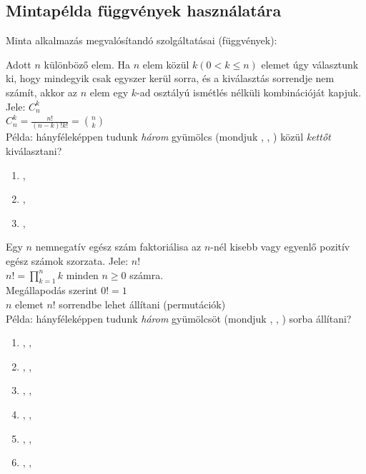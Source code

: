 \documentclass[usenames,dvipsnames,aspectratio=169]{beamer}
\begin{document}
\subsection{Mintapélda függvények használatára}
\begin{frame}
  Minta alkalmazás megvalósítandó szolgáltatásai (függvények):
  \vfill
  \begin{description}[mm]
    \item[Kombináció] Adott $n$ különböző elem. Ha $n$ elem közül $k (0 < k \leq n)$ elemet úgy választunk ki, 
hogy mindegyik csak egyszer kerül sorra, és a kiválasztás sorrendje nem számít, akkor az $n$ elem egy $k$-ad osztályú ismétlés 
nélküli kombinációját kapjuk. Jele: $C_n^k$\\
    \vfill
    $C_n^k = \frac{n!}{(n-k)!k!} = {n \choose k}$\\
    \vfill
    Példa: hányféleképpen tudunk \emph{három} gyümölcs (mondjuk , , ) közül 
\emph{kettőt} kiválasztani?
    \begin{enumerate}
      \item {}, 
      \item {}, 
      \item {}, 
    \end{enumerate}
  \end{description}
\end{frame}

\begin{frame}
  \begin{description}[mm]
    \item[Faktoriális] Egy $n$ nemnegatív egész szám faktoriálisa az $n$-nél kisebb vagy egyenlő pozitív egész számok 
szorzata. Jele: $n!$\\
    $n! = \prod_{k=1}^{n}k$ minden $n \geq 0$ számra.\\
    Megállapodás szerint $0! = 1$\\
    $n$ elemet $n!$ sorrendbe lehet állítani (permutációk)\\
    Példa: hányféleképpen tudunk \emph{három} gyümölcsöt (mondjuk , , ) sorba 
állítani?
    \begin{enumerate}
      \item {}, , 
      \item {}, , 
      \item {}, , 
      \item {}, , 
      \item {}, , 
      \item {}, , 
    \end{enumerate}
  \end{description}
\end{frame}
\end{document}
